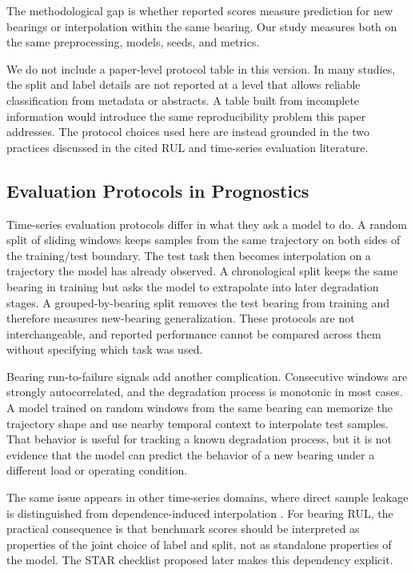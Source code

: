 \documentclass[5p,twocolumn]{elsarticle}
\begin{document}
The methodological gap is whether reported scores measure prediction for new bearings or interpolation within the same bearing. Our study measures both on the same preprocessing, models, seeds, and metrics.

We do not include a paper-level protocol table in this version. In many studies, the split and label details are not reported at a level that allows reliable classification from metadata or abstracts. A table built from incomplete information would introduce the same reproducibility problem this paper addresses. The protocol choices used here are instead grounded in the two practices discussed in the cited RUL and time-series evaluation literature.

\subsection{Evaluation Protocols in Prognostics}
Time-series evaluation protocols differ in what they ask a model to do. A random split of sliding windows keeps samples from the same trajectory on both sides of the training/test boundary. The test task then becomes interpolation on a trajectory the model has already observed. A chronological split keeps the same bearing in training but asks the model to extrapolate into later degradation stages. A grouped-by-bearing split removes the test bearing from training and therefore measures new-bearing generalization. These protocols are not interchangeable, and reported performance cannot be compared across them without specifying which task was used.

Bearing run-to-failure signals add another complication. Consecutive windows are strongly autocorrelated, and the degradation process is monotonic in most cases. A model trained on random windows from the same bearing can memorize the trajectory shape and use nearby temporal context to interpolate test samples. That behavior is useful for tracking a known degradation process, but it is not evidence that the model can predict the behavior of a new bearing under a different load or operating condition.

The same issue appears in other time-series domains, where direct sample leakage is distinguished from dependence-induced interpolation \cite{leakage_nature,leakage_frontiers}. For bearing RUL, the practical consequence is that benchmark scores should be interpreted as properties of the joint choice of label and split, not as standalone properties of the model. The STAR checklist proposed later makes this dependency explicit.
\end{document}
